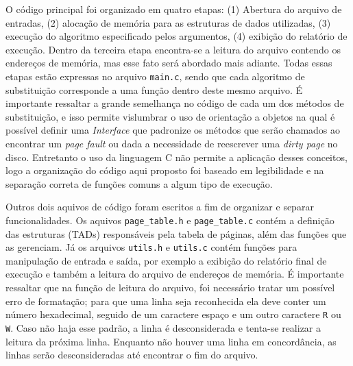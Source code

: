 O código principal foi organizado em quatro etapas: (1) Abertura do
arquivo de entradas, (2) alocação de memória para as estruturas de dados
utilizadas, (3) execução do algoritmo especificado pelos argumentos, (4)
exibição do relatório de execução.
Dentro da terceira etapa encontra-se a leitura do arquivo contendo os endereços de
memória, mas esse fato será abordado mais adiante.
Todas essas etapas estão expressas no arquivo \texttt{main.c}, sendo que cada
algoritmo de substituição corresponde a uma função dentro deste mesmo arquivo.
É importante ressaltar a grande semelhança no código de cada um dos métodos de
substituição, e isso permite vislumbrar o uso de orientação a objetos na qual
é possível definir uma \textit{Interface} que padronize os métodos que serão
chamados ao encontrar um \textit{page fault} ou dada a necessidade de
reescrever uma \textit{dirty page} no disco.
Entretanto o uso da linguagem C não permite a aplicação desses conceitos, logo
a organização do código aqui proposto foi baseado em legibilidade e na
separação correta de funções comuns a algum tipo de execução.

Outros dois aquivos de código foram escritos a fim de organizar e separar
funcionalidades.
Os aquivos \texttt{page\_table.h} e \texttt{page\_table.c} contém a definição
das estruturas (TADs) responsáveis pela tabela de páginas, além das funções que
as gerenciam.
Já os arquivos \texttt{utils.h} e \texttt{utils.c} contém funções
para manipulação de entrada e saída, por exemplo a exibição do relatório final
de execução e também a leitura do arquivo de endereços de memória.
É importante ressaltar que na função de leitura do arquivo, foi necessário
tratar um possível erro de formatação; para que uma linha seja reconhecida
ela deve conter um número hexadecimal, seguido de um caractere espaço e um
outro caractere \texttt{R} ou \texttt{W}.
Caso não haja esse padrão, a linha é desconsiderada e tenta-se realizar a
leitura da próxima linha.
Enquanto não houver uma linha em concordância, as linhas serão
desconsideradas até encontrar o fim do arquivo.

